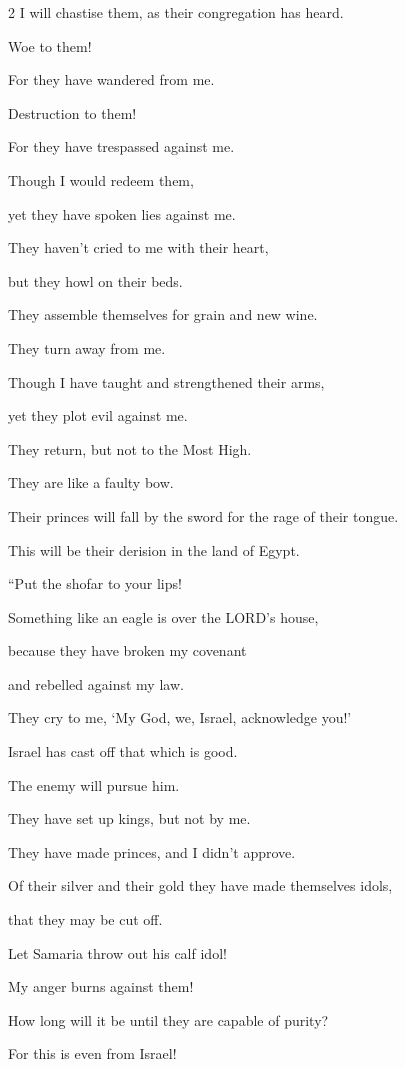 \begin{multicols}{2}
I will chastise them, as their congregation has heard.

\myverse{}Woe to them!

For they have wandered from me.

Destruction to them!

For they have trespassed against me.

Though I would redeem them,

yet they have spoken lies against me.

\myverse{}They haven’t cried to me with their heart,

but they howl on their beds.

They assemble themselves for grain and new wine.

They turn away from me.

\myverse{}Though I have taught and strengthened their arms,

yet they plot evil against me.

\myverse{}They return, but not to the Most High.

They are like a faulty bow.

Their princes will fall by the sword for the rage of their tongue.

This will be their derision in the land of Egypt.


\mychapter{} \myverse*{}“Put the shofar to your lips!

Something like an eagle is over the LORD’s house,

because they have broken my covenant

and rebelled against my law.

\myverse{}They cry to me, ‘My God, we, Israel, acknowledge you!’

\myverse{}Israel has cast off that which is good.

The enemy will pursue him.

\myverse{}They have set up kings, but not by me.

They have made princes, and I didn’t approve.

Of their silver and their gold they have made themselves idols,

that they may be cut off.

\myverse{}Let Samaria throw out his calf idol!

My anger burns against them!

How long will it be until they are capable of purity?

\myverse{}For this is even from Israel!


\end{multicols}
